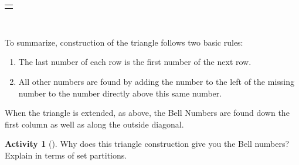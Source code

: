 \documentclass[10pt,]{book}
\theoremstyle{plain}
\theoremstyle{definition}
\theoremstyle{definition}
\theoremstyle{definition}
\newtheorem{activity}[project]{Activity}
\numberwithin{equation}{chapter}
\newlength{\panelmax}
\begin{document}
{%
\setlength{\panelmax}{0pt}
\ifdefined\panelboxAtabular\else\newsavebox{\panelboxAtabular}\fi%
\ifdefined\phAtabular\else\newlength{\phAtabular}\fi%
\setlength{\phAtabular}{\ht\panelboxAtabular+\dp\panelboxAtabular}
\settototalheight{\phAtabular}{\usebox{\panelboxAtabular}}
\setlength{\panelmax}{\maxof{\panelmax}{\phAtabular}}
\leavevmode%
\setlength{\tabcolsep}{0\linewidth}
\par\medskip\noindent
\hspace*{0.15\linewidth}%
\begin{tabular}{@{}*{1}{c}@{}}
\begin{minipage}[c][\panelmax][t]{0.7\linewidth}\usebox{\panelboxAtabular}\end{minipage}\end{tabular}\\
}%
\par
\hypertarget{p-1470}{}%
To summarize, construction of the triangle follows two basic rules: \leavevmode%
\begin{enumerate}
\item\hypertarget{li-57}{}\hypertarget{p-1471}{}%
The last number of each row is the first number of the next row.%
\item\hypertarget{li-58}{}\hypertarget{p-1472}{}%
All other numbers are found by adding the number to the left of the missing number to the number directly above this same number.%
\end{enumerate}
 When the triangle is extended, as above, the Bell Numbers are found down the first column as well as along the outside diagonal.%
\begin{activity}[]\label{activity-290}
\hypertarget{p-1473}{}%
Why does this triangle construction give you the Bell numbers?  Explain in terms of set partitions.%
\end{activity}
\end{document}
